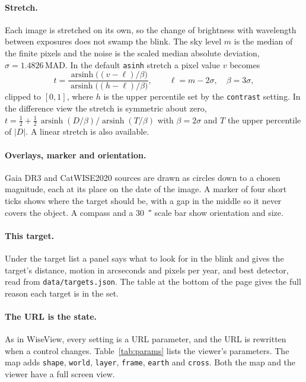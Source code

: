 \documentclass[11pt,a4paper]{article}
\begin{document}
\paragraph{Stretch.} Each image is stretched on its own, so the change of brightness with
wavelength between exposures does not swamp the blink. The sky level $m$ is the median of the
finite pixels and the noise is the scaled median absolute deviation, $\sigma = 1.4826\,\mathrm{MAD}$.
In the default \texttt{asinh} stretch a pixel value $v$ becomes
\begin{equation}
  t = \frac{\operatorname{arsinh}\big((v - \ell)/\beta\big)}
           {\operatorname{arsinh}\big((h - \ell)/\beta\big)},
  \qquad \ell = m - 2\sigma, \quad \beta = 3\sigma,
\end{equation}
clipped to $[0,1]$, where $h$ is the upper percentile set by the \texttt{contrast} setting. In
the difference view the stretch is symmetric about zero, $t = \tfrac12 + \tfrac12\,
\operatorname{arsinh}(D/\beta)/\operatorname{arsinh}(T/\beta)$ with $\beta = 2\sigma$ and $T$
the upper percentile of $|D|$. A linear stretch is also available.

\paragraph{Overlays, marker and orientation.} Gaia DR3 and CatWISE2020 sources are drawn as
circles down to a chosen magnitude, each at its place on the date of the image. A marker of four
short ticks shows where the target should be, with a gap in the middle so it never covers the
object. A compass and a \SI{30}{\arcsecond} scale bar show orientation and size.

\paragraph{This target.} Under the target list a panel says what to look for in the blink and
gives the target's distance, motion in arcseconds and pixels per year, and best detector, read
from \texttt{data/targets.json}. The table at the bottom of the page gives the full reason each
target is in the set.

\paragraph{The URL is the state.} As in WiseView, every setting is a URL parameter, and the URL
is rewritten when a control changes. Table~\ref{tab:params} lists the viewer's parameters. The
map adds \texttt{shape}, \texttt{world}, \texttt{layer}, \texttt{frame}, \texttt{earth} and
\texttt{cross}. Both the map and the viewer have a full screen view.
\end{document}
